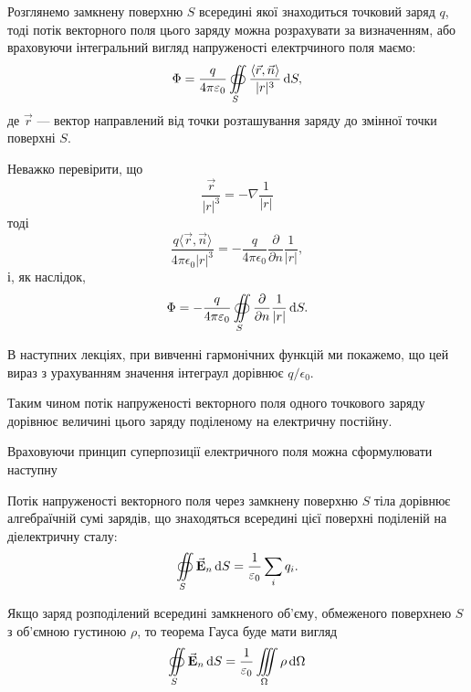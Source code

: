 Розглянемо замкнену поверхню $S$ всередині якої знаходиться точковий заряд $q$, тоді потік векторного поля цього заряду можна розрахувати за визначенням, або враховуючи інтегральний вигляд напруженості електрчиного поля маємо:
\begin{equation}
	\Phi = \frac{q}{4 \pi\epsilon_0} \Oiint_S \frac{\langle \vec r, \vec n\rangle}{|r|^3} \diff S,
\end{equation}
де $\vec r$ --- вектор направлений від точки розташування заряду до змінної точки поверхні $S$. \medskip

Неважко перевірити, що
\begin{equation}
	\frac{\vec r}{|r|^3} = - \nabla \frac{1}{|r|}
\end{equation}
тоді
\begin{equation}
	\frac{q\langle \vec r,\vec n\rangle}{4 \pi \epsilon_0 |r|^3} = - \frac{q}{4 \pi \epsilon_0} \frac{\partial}{\partial n} \frac{1}{|r|},
\end{equation}
і, як наслідок,
\begin{equation}
	\Phi = - \frac{q}{4 \pi \varepsilon_0} \displaystyle\oiint\limits_S \frac{\partial}{\partial n} \frac{1}{|r|} \mathop{}\!\mathrm{d} S.
\end{equation}

В наступних лекціях, при вивченні гармонічних функцій ми покажемо, що цей вираз з урахуванням значення інтеграул дорівнює  $q / \epsilon_0$. \medskip

Таким чином потік напруженості векторного поля одного точкового заряду дорівнює величині цього заряду поділеному на електричну постійну. \medskip

Враховуючи принцип суперпозиції електричного поля можна сформулювати наступну
\begin{theorem}
	Потік напруженості векторного поля через замкнену поверхню $S$ тіла дорівнює алгебраїчній сумі зарядів, що знаходяться всередині цієї поверхні поділеній на діелектричну сталу:
	\begin{equation}
		\displaystyle\oiint\limits_S {\vec{\mathbf{E}}}_n \mathop{}\!\mathrm{d} S = \frac{1}{\varepsilon_0} \displaystyle\sum\limits_i q_i.
	\end{equation}
\end{theorem}

Якщо заряд розподілений всередині замкненого об'єму, обмеженого поверхнею $S$ з об'ємною густиною $\rho$, то теорема Гауса буде мати вигляд
\begin{equation}
	\displaystyle\oiint\limits_S {\vec{\mathbf{E}}}_n \mathop{}\!\mathrm{d} S = \frac{1}{\varepsilon_0} \displaystyle\iiint\limits_\Omega \rho \mathop{}\!\mathrm{d} \Omega
\end{equation}

